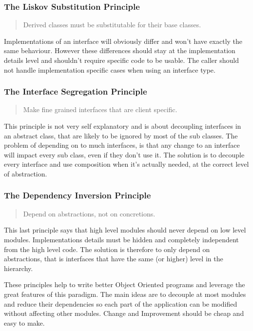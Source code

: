 \subsubsection{The Liskov Substitution Principle}
\begin{quotation}
    Derived classes must be substitutable for their base classes.
\end{quotation}
Implementations of an interface will obviously differ and won't have
exactly the same behaviour.
However these differences should stay at the implementation details level
and shouldn't require specific code to be usable.
The caller should not handle implementation specific cases when using
an interface type.

\subsubsection{The Interface Segregation Principle}
\begin{quotation}
    Make fine grained interfaces that are client specific.
\end{quotation}
This principle is not very self explanatory and is about decoupling
interfaces in an abstract class, that are likely to be ignored by most
of the sub classes.
The problem of depending on to much interfaces, is that any change
to an interface will impact every sub class, even if they don't use it.
The solution is to decouple every interface and use composition when it's
actually needed, at the correct level of abstraction.

\subsubsection{The Dependency Inversion Principle}
\begin{quotation}
    Depend on abstractions, not on concretions.
\end{quotation}
This last principle says that high level modules should never depend on
low level modules.
Implementations details must be hidden and completely independent from
the high level code.
The solution is therefore to only depend on abstractions, that is
interfaces that have the same (or higher) level in the hierarchy. \\
\newline

These principles help to write better Object Oriented programs and
leverage the great features of this paradigm.
The main ideas are to decouple at most modules and reduce their
dependencies so each part of the application can be modified without
affecting other modules.
Change and Improvement should be cheap and easy to make.

